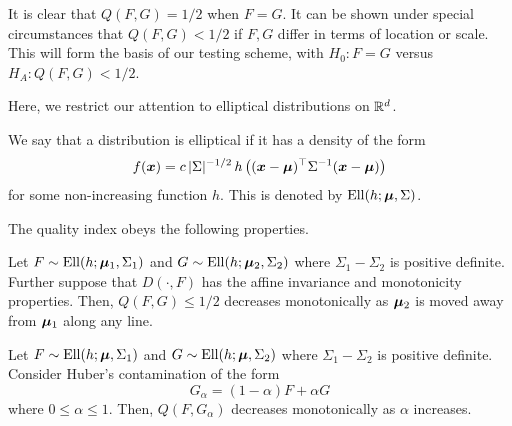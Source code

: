It is clear that $Q(F, G) = 1/2$ when $F = G$.
It can be shown under special circumstances that $Q(F, G) < 1/2$ if $F, G$
differ in terms of location or scale.
This will form the basis of our testing scheme, with $H_0: F = G$ versus $H_A:
Q(F, G) < 1/2$.

Here, we restrict our attention to elliptical distributions on $\mathbb{R}^d$.

\begin{definition}
    We say that a distribution is elliptical if it has a density of the form
    \begin{equation}
        f(\bm{x}) = c\, |\Sigma|^{-1/2}\, h\left((\bm{x} - \bm{\mu})^\top \Sigma^{-1} (\bm{x} - \bm{\mu})\right)
    \end{equation}
    for some non-increasing function $h$.
    This is denoted by $\operatorname{Ell}(h; \bm{\mu}, \Sigma)$.
\end{definition}



The quality index obeys the following properties.

\begin{proposition}
    Let $F \sim \operatorname{Ell}(h; \bm{\mu}_1, \Sigma_1)$ and $G \sim \operatorname{Ell}(h; \bm{\mu}_2,
    \Sigma_2)$ where $\Sigma_1 - \Sigma_2$ is positive definite.
    Further suppose that $D(\cdot, F)$ has the affine invariance and
    monotonicity properties.
    Then, $Q(F, G) \leq 1/2$ decreases monotonically as $\bm{\mu}_2$ is moved away
    from $\bm{\mu}_1$ along any line.
\end{proposition}

\begin{proposition}
    Let $F \sim \operatorname{Ell}(h; \bm{\mu}, \Sigma_1)$ and $G \sim \operatorname{Ell}(h; \bm{\mu},
    \Sigma_2)$ where $\Sigma_1 - \Sigma_2$ is positive definite.
    Consider Huber's contamination of the form
    \begin{equation}
        G_\alpha = (1 - \alpha)F + \alpha G
    \end{equation}
    where $0 \leq \alpha \leq 1$.
    Then, $Q(F, G_\alpha)$ decreases monotonically as $\alpha$ increases.
\end{proposition}

